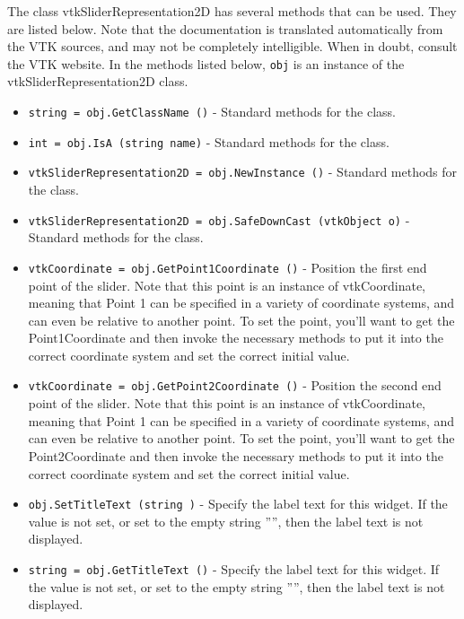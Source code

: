 The class vtkSliderRepresentation2D has several methods that can be used.
  They are listed below.
Note that the documentation is translated automatically from the VTK sources,
and may not be completely intelligible.  When in doubt, consult the VTK website.
In the methods listed below, \verb|obj| is an instance of the vtkSliderRepresentation2D class.
\begin{itemize}
\item  \verb|string = obj.GetClassName ()| -  Standard methods for the class.

\item  \verb|int = obj.IsA (string name)| -  Standard methods for the class.

\item  \verb|vtkSliderRepresentation2D = obj.NewInstance ()| -  Standard methods for the class.

\item  \verb|vtkSliderRepresentation2D = obj.SafeDownCast (vtkObject o)| -  Standard methods for the class.

\item  \verb|vtkCoordinate = obj.GetPoint1Coordinate ()| -  Position the first end point of the slider. Note that this point is an
 instance of vtkCoordinate, meaning that Point 1 can be specified in a
 variety of coordinate systems, and can even be relative to another
 point. To set the point, you'll want to get the Point1Coordinate and
 then invoke the necessary methods to put it into the correct coordinate
 system and set the correct initial value.

\item  \verb|vtkCoordinate = obj.GetPoint2Coordinate ()| -  Position the second end point of the slider. Note that this point is an
 instance of vtkCoordinate, meaning that Point 1 can be specified in a
 variety of coordinate systems, and can even be relative to another
 point. To set the point, you'll want to get the Point2Coordinate and
 then invoke the necessary methods to put it into the correct coordinate
 system and set the correct initial value.

\item  \verb|obj.SetTitleText (string )| -  Specify the label text for this widget. If the value is not set, or set
 to the empty string '''', then the label text is not displayed.

\item  \verb|string = obj.GetTitleText ()| -  Specify the label text for this widget. If the value is not set, or set
 to the empty string '''', then the label text is not displayed.


\end{itemize}
